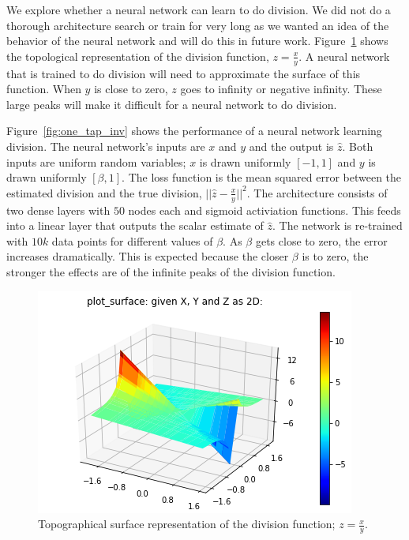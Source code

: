 We explore whether a neural network can learn to do division.  We did not do a thorough architecture search or train for very long as we wanted an idea of the behavior of the neural network and will do this in future work.  
Figure~\ref{fig:div_fx} shows the topological representation of the division function, $z=\frac{x}{y}$.  A neural network that is trained to do division will need to approximate the surface of this function.  
When $y$ is close to zero, $z$ goes to infinity or negative infinity.  These large peaks will make it difficult for a neural network to do division.  

Figure~\ref{fig:one_tap_inv} shows the performance of a neural network learning division.
The neural network's inputs are $x$ and $y$ and the output is $\hat{z}$.  Both inputs are uniform random variables; $x$ is drawn uniformly $[-1,1]$ and $y$ is drawn uniformly $[\beta,1]$. 
The loss function is the mean squared error between the estimated division and the true division, $||\hat{z}-\frac{x}{y}||^2$.
The architecture consists of two dense layers with $50$ nodes each and sigmoid activiation functions.  This feeds into a linear layer that outputs the scalar estimate of $\hat{z}$.  
The network is re-trained with $10k$ data points for different values of $\beta$. As $\beta$ gets close to zero, the error increases dramatically.  This is expected because the closer $\beta$ is to zero, the stronger the effects are of the infinite peaks of the division function.

\begin{figure}
\begin{center}
\includegraphics{figures/equal/Division_Function_plot.png}
\caption{Topographical surface representation of the division function; $z=\frac{x}{y}$.}
\label{fig:div_fx}
\end{center}
\end{figure}

